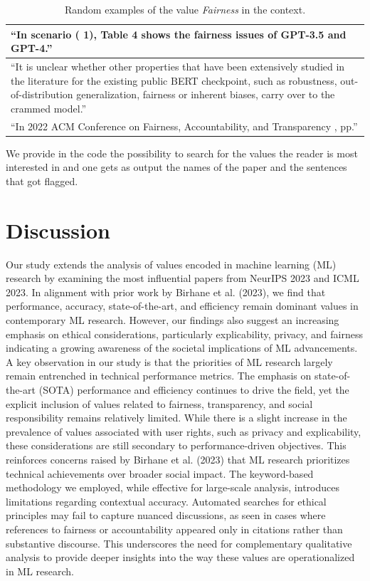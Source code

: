 \documentclass{article}
\begin{document}
\begin{table}[H]
    \centering
    \begin{tabular}{p{12cm}}
        \toprule
        ``In scenario ( 1), Table 4 shows the fairness issues of GPT-3.5 and GPT-4.'' \\
        \midrule
        ``It is unclear whether other properties that have been extensively studied in the literature for the existing public BERT checkpoint, such as robustness, out-of-distribution generalization, fairness or inherent biases, carry over to the crammed model.'' \\
        \midrule
        ``In 2022 ACM Conference on Fairness, Accountability, and Transparency , pp.'' \\
        \bottomrule
    \end{tabular}
    \caption{Random examples of the value \textit{Fairness} in the context.}
    \label{tab:qualitative_examples_fairness}
\end{table}

We provide in the code the possibility to search for the values the reader is most interested in and one gets 
as output the names of the paper and the sentences that got flagged. 

\section{Discussion}
\label{sec:discussion}
Our study extends the analysis of values encoded in machine learning (ML) research by examining the most influential papers from NeurIPS 2023 and ICML 2023. In alignment with prior work by Birhane et al. (2023), 
we find that performance, accuracy, state-of-the-art, and efficiency remain dominant values in contemporary ML research. However, our findings also suggest an increasing emphasis on ethical considerations, particularly 
explicability, privacy, and fairness indicating a growing awareness of the societal implications of ML advancements.
A key observation in our study is that the priorities of ML research largely remain entrenched in technical performance metrics. The emphasis on state-of-the-art (SOTA) performance and efficiency continues to drive the field, 
yet the explicit inclusion of values related to fairness, transparency, and social responsibility remains relatively limited. While there is a slight increase in the prevalence of values associated with user rights, such as 
privacy and explicability, these considerations are still secondary to performance-driven objectives. This reinforces concerns raised by Birhane et al. (2023) that ML research prioritizes technical achievements over broader 
social impact.
The keyword-based methodology we employed, while effective for large-scale analysis, introduces limitations regarding contextual accuracy. Automated searches for ethical principles may fail to capture nuanced discussions, 
as seen in cases where references to fairness or accountability appeared only in citations rather than substantive discourse. This underscores the need for complementary qualitative analysis to provide deeper insights into 
the way these values are operationalized in ML research.
\end{document}

